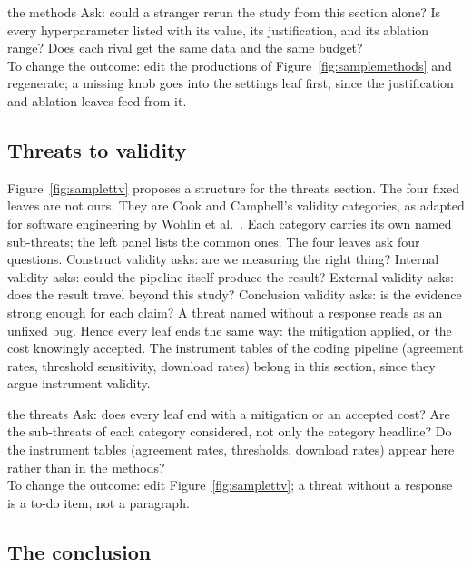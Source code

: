 \begin{pause}{the methods}
Ask: could a stranger rerun the study from this section alone?
Is every hyperparameter listed with its value, its justification,
and its ablation range?
Does each rival get the same data and the same budget?\\[0.2em]
To change the outcome: edit the productions of
Figure~\ref{fig:samplemethods} and regenerate; a missing knob
goes into the {\ttfamily settings} leaf first, since the
justification and ablation leaves feed from it.
\end{pause}

\subsection{Threats to validity}
\label{sec:ttv}



Figure~\ref{fig:samplettv} proposes a structure for the threats
section.
The four fixed leaves are not ours.
They are Cook and Campbell's validity categories, as adapted for
software engineering by Wohlin et al.~\cite{wohlin12}.
Each category carries its own named sub-threats; the left panel
lists the common ones.
The four leaves ask four questions.
Construct validity asks: are we measuring the right thing?
Internal validity asks: could the pipeline itself produce the
result?
External validity asks: does the result travel beyond this
study?
Conclusion validity asks: is the evidence strong enough for each
claim?
A threat named without a response reads as an unfixed bug.
Hence every leaf ends the same way: the mitigation applied, or
the cost knowingly accepted.
The instrument tables of the coding pipeline (agreement rates,
threshold sensitivity, download rates) belong in this section,
since they argue instrument validity.

\begin{pause}{the threats}
Ask: does every leaf end with a mitigation or an accepted cost?
Are the sub-threats of each category considered, not only the
category headline?
Do the instrument tables (agreement rates, thresholds, download
rates) appear here rather than in the methods?\\[0.2em]
To change the outcome: edit Figure~\ref{fig:samplettv}; a threat
without a response is a to-do item, not a paragraph.
\end{pause}

\subsection{The conclusion}
\label{sec:conclusion}

